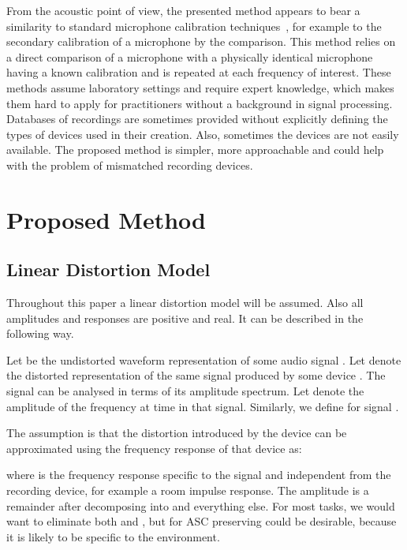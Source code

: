 \documentclass[a4paper]{article}
\begin{document}
From the acoustic point of view, the presented method appears to bear a similarity to standard microphone calibration techniques~\cite{iec-61094-5}, for example to the secondary calibration of a microphone by the comparison. This method relies on a direct comparison of a microphone with a physically identical microphone having a known calibration and is repeated at each frequency of interest. These methods assume laboratory settings and require expert knowledge, which makes them hard to apply for practitioners without a background in signal processing. Databases of recordings are sometimes provided without explicitly defining the types of devices used in their creation. Also, sometimes the devices are not easily available. The proposed method is simpler, more approachable and could help with the problem of mismatched recording devices.



\section{Proposed Method}
\label{sec:proposed-method}

\subsection{Linear Distortion Model}
\label{ssec:dist-model}

Throughout this paper a linear distortion model will be assumed. Also all amplitudes and responses are positive and real. It can be described in the following way.

Let  be the undistorted waveform representation of some audio signal . Let  denote the distorted representation of the same signal produced by some device . The signal  can be analysed in terms of its amplitude spectrum. Let  denote the amplitude of the frequency  at time  in that signal. Similarly, we define  for signal .

The assumption is that the distortion introduced by the device can be approximated using the frequency response of that device  as:



\noindent where  is the frequency response specific to the signal  and independent from the recording device, for example a room impulse response. The amplitude  is a remainder after decomposing  into  and everything else. For most tasks, we would want to eliminate both  and , but for ASC preserving  could be desirable, because it is likely to be specific to the environment.
\end{document}
